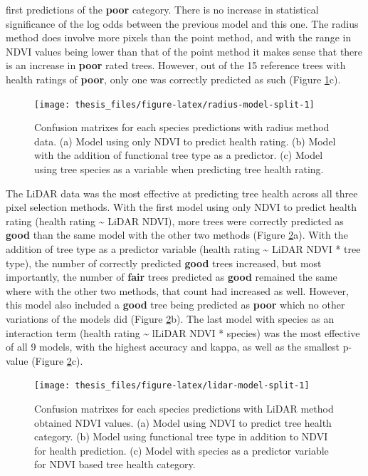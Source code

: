 \documentclass[12pt,twoside]{reedthesis}
\begin{document}
first predictions of the \textbf{poor} category. There is no increase in
statistical significance of the log odds between the previous model and
this one. The radius method does involve more pixels than the point
method, and with the range in NDVI values being lower than that of the
point method it makes sense that there is an increase in \textbf{poor} rated
trees. However, out of the 15 reference trees with health ratings of
\textbf{poor}, only one was correctly predicted as such (Figure
\ref{fig:radius-model-split}c).
\begin{figure}

{\centering \texttt{[image: thesis\_files/figure-latex/radius-model-split-1]} 

}

\caption[Confusion matrixes for Radius method predictive models]{Confusion matrixes for each species predictions with radius method data. (a) Model using only NDVI to predict health rating. (b) Model with the addition of functional tree type as a predictor. (c) Model using tree species as a variable when predicting tree health rating.}\label{fig:radius-model-split}
\end{figure}
The LiDAR data was the most effective at predicting tree health across
all three pixel selection methods. With the first model using only NDVI
to predict health rating (health rating \textasciitilde{} LiDAR NDVI), more trees were
correctly predicted as \textbf{good} than the same model with the other two
methods (Figure \ref{fig:lidar-model-split}a). With the addition of
tree type as a predictor variable (health rating \textasciitilde{} LiDAR NDVI * tree
type), the number of correctly predicted \textbf{good} trees increased, but
most importantly, the number of \textbf{fair} trees predicted as \textbf{good}
remained the same where with the other two methods, that count had
increased as well. However, this model also included a \textbf{good} tree
being predicted as \textbf{poor} which no other variations of the models did
(Figure \ref{fig:lidar-model-split}b). The last model with species as
an interaction term (health rating \textasciitilde{} lLiDAR NDVI * species) was the
most effective of all 9 models, with the highest accuracy and kappa, as
well as the smallest p-value (Figure \ref{fig:lidar-model-split}c).
\begin{figure}

{\centering \texttt{[image: thesis\_files/figure-latex/lidar-model-split-1]} 

}

\caption[Confusion matrixes for LiDAR method predictive models]{Confusion matrixes for each species predictions with LiDAR method obtained NDVI values. (a) Model using NDVI to predict tree health category. (b) Model using functional tree type in addition to NDVI for health prediction. (c) Model with species as a predictor variable for NDVI based tree health category.}\label{fig:lidar-model-split}
\end{figure}
\end{document}
